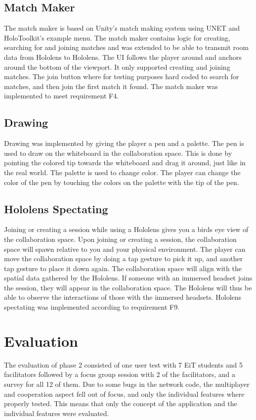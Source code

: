         \subsection{Match Maker}
        The match maker is based on Unity's match making system using UNET and HoloToolkit's example menu. The match maker contains logic for creating, searching for and joining matches and was extended to be able to transmit room data from Hololens to Hololens. The UI follows the player around and anchors around the bottom of the viewport. It only supported creating and joining matches. The join button where for testing purposes hard coded to search for matches, and then join the first match it found. The match maker was implemented to meet requirement F4. %
        
        \subsection{Drawing}
        Drawing was implemented by giving the player a pen and a palette. The pen is used to draw on the whiteboard in the collaboration space. This is done by pointing the colored tip towards the whiteboard and drag it around, just like in the real world. The palette is used to change color. The player can change the color of the pen by touching the colors on the palette with the tip of the pen.  %
        
        \subsection{Hololens Spectating}
        Joining or creating a session while using a Hololens gives you a birds eye view of the collaboration space. Upon joining or creating a session, the collaboration space will spawn relative to you and your physical environment. The player can move the collaboration space by doing a tap gesture to pick it up, and another tap gesture to place it down again. The collaboration space will align with the spatial data gathered by the Hololens. If someone with an immersed headset joins the session, they will appear in the collaboration space. The Hololens will thus be able to observe the interactions of those with the immersed headsets. Hololens spectating was implemented according to requirement F9.
    
    \section{Evaluation}
    The evaluation of phase 2 consisted of one user test with 7 EiT students and 5 facilitators followed by a focus group session with 2 of the facilitators, and a survey for all 12 of them.
    Due to some bugs in the network code, the multiplayer and cooperation aspect fell out of focus, and only the individual features where properly tested. This means that only the concept of the application and the individual features were evaluated.
    
